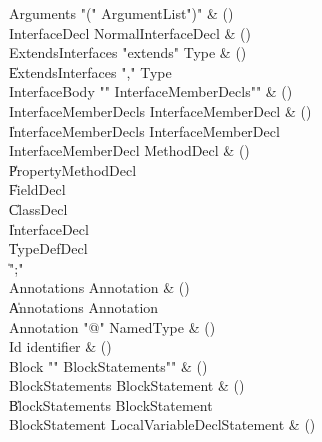\begin{bbgrammar}

 Arguments  \label{prod:Arguments}  \: \xcd"(" ArgumentList\opt \xcd")" & ()\\
 InterfaceDecl  \label{prod:InterfaceDecl}  \: NormalInterfaceDecl & ()\\
 ExtendsInterfaces  \label{prod:ExtendsInterfaces}  \: \xcd"extends" Type & ()\\
    \| ExtendsInterfaces \xcd"," Type\\
 InterfaceBody  \label{prod:InterfaceBody}  \: \xcd"{" InterfaceMemberDecls\opt \xcd"}" & ()\\
 InterfaceMemberDecls  \label{prod:InterfaceMemberDecls}  \: InterfaceMemberDecl & ()\\
    \| InterfaceMemberDecls InterfaceMemberDecl\\
 InterfaceMemberDecl  \label{prod:InterfaceMemberDecl}  \: MethodDecl & ()\\
    \| PropertyMethodDecl\\
    \| FieldDecl\\
    \| ClassDecl\\
    \| InterfaceDecl\\
    \| TypeDefDecl\\
    \| \xcd";"\\
 Annotations  \label{prod:Annotations}  \: Annotation & ()\\
    \| Annotations Annotation\\
 Annotation  \label{prod:Annotation}  \: \xcd"@" NamedType & ()\\
 Id  \label{prod:Id}  \: identifier & ()\\
 Block  \label{prod:Block}  \: \xcd"{" BlockStatements\opt \xcd"}" & ()\\
 BlockStatements  \label{prod:BlockStatements}  \: BlockStatement & ()\\
    \| BlockStatements BlockStatement\\
 BlockStatement  \label{prod:BlockStatement}  \: LocalVariableDeclStatement & ()\\

\end{bbgrammar}
